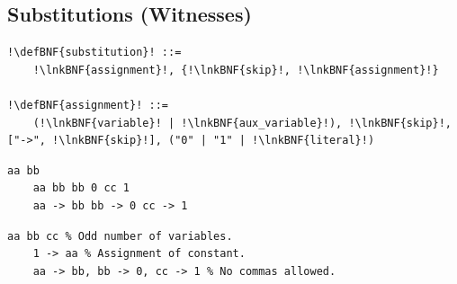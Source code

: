 \documentclass[a4paper]{article}
\newcommand{\defBNF}[1]{\hypertarget{def:#1}{<\detokenize{#1}>}}
\newcommand{\lnkBNF}[1]{\hyperlink{def:#1}{<\detokenize{#1}>}}
\begin{document}
\subsection{Substitutions (Witnesses)}\label{sec:substitutions}
\begin{lstlisting}
!\defBNF{substitution}! ::=
	!\lnkBNF{assignment}!, {!\lnkBNF{skip}!, !\lnkBNF{assignment}!}

!\defBNF{assignment}! ::=
	(!\lnkBNF{variable}! | !\lnkBNF{aux_variable}!), !\lnkBNF{skip}!, ["->", !\lnkBNF{skip}!], ("0" | "1" | !\lnkBNF{literal}!)
\end{lstlisting}
\begin{minipage}{.49\linewidth}
	\begin{lstlisting}[language=veripb, gobble=4, rulecolor=\color{veripb-valid-text}, caption={Syntactically correct substitutions.}]
	aa bb
	aa bb bb 0 cc 1
	aa -> bb bb -> 0 cc -> 1
	\end{lstlisting}
\end{minipage}\hfill%
\begin{minipage}{.49\linewidth}
	\begin{lstlisting}[language=veripb, gobble=4, rulecolor=\color{veripb-invalid-text}, caption={Syntactically incorrect substitutions.}]
	aa bb cc % Odd number of variables.
	1 -> aa % Assignment of constant.
	aa -> bb, bb -> 0, cc -> 1 % No commas allowed.
	\end{lstlisting}
\end{minipage}
\end{document}
